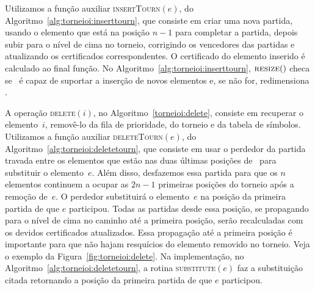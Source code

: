 



Utilizamos a função auxiliar \textsc{insertTourn}$(e)$, do
Algoritmo~\ref{alg:torneioi:inserttourn},
que consiste em criar uma nova partida, usando o elemento que está na posição $n-1$ para completar
a partida, depois subir para o nível de cima no torneio, corrigindo os vencedores das partidas e
atualizando os certificados correspondentes.
O certificado do elemento inserido é calculado ao final função.
No Algoritmo~\ref{alg:torneioi:inserttourn}, $\textsc{resize}()$ checa se \torneio~é capaz de suportar
a inserção de novos elementos e, se não for, redimensiona \torneio.



A operação \textsc{delete}$(i)$, no Algoritmo~\ref{torneioi:delete}, consiste em recuperar o
elemento~$i$, removê-lo da fila de prioridade, do torneio e da tabela de símbolos.
Utilizamos a função auxiliar \textsc{deleteTourn}$(e)$, do Algoritmo~\ref{alg:torneioi:deletetourn},
que consiste em usar o perdedor da partida travada entre os elementos que estão nas duas últimas
posições de \torneio~para substituir o elemento~$e$.
Além disso, desfazemos essa partida para que os $n$ elementos continuem a ocupar as $2n - 1$
primeiras posições do torneio após a remoção de~$e$.
O perdedor substituirá o elemento~$e$ na posição da primeira partida de que $e$ participou.
Todas as partidas desde essa posição, se propagando para o nível de cima no caminho até a primeira
posição, serão recalculadas com os devidos certificados atualizados.
Essa propagação até a primeira posição é importante para que não hajam resquícios do elemento
removido no torneio.
Veja o exemplo da Figura~\ref{fig:torneioi:delete}.
Na implementação, no Algoritmo~\ref{alg:torneioi:deletetourn}, a rotina \textsc{substitute}$(e)$ faz a
substituição citada retornando a posição da primeira partida de que $e$ participou.






